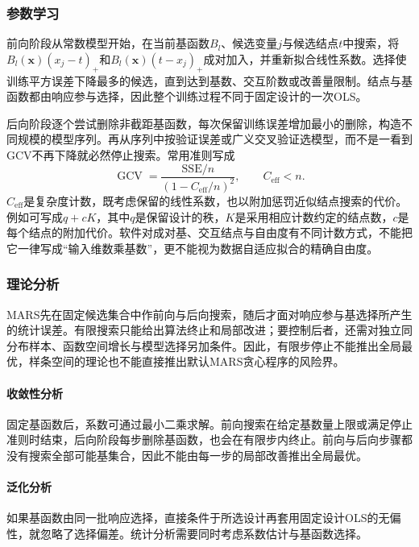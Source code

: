 \subsubsection{参数学习}

前向阶段从常数模型开始，在当前基函数$B_l$、候选变量$j$与候选结点$t$中搜索，将$B_l(\bm{x})(x_j-t)_+$和$B_l(\bm{x})(t-x_j)_+$成对加入，并重新拟合线性系数。选择使训练平方误差下降最多的候选，直到达到基数、交互阶数或改善量限制。结点与基函数都由响应参与选择，因此整个训练过程不同于固定设计的一次OLS。

后向阶段逐个尝试删除非截距基函数，每次保留训练误差增加最小的删除，构造不同规模的模型序列。再从序列中按验证误差或广义交叉验证选模型，而不是一看到GCV不再下降就必然停止搜索。常用准则写成
\begin{equation}
  \operatorname{GCV}
  =\frac{\mathrm{SSE}/n}{(1-C_{\mathrm{eff}}/n)^2},
  \qquad C_{\mathrm{eff}}<n.
  \label{eq:regression-mars-gcv}
\end{equation}
$C_{\mathrm{eff}}$是复杂度计数，既考虑保留的线性系数，也以附加惩罚近似结点搜索的代价。例如可写成$q+cK$，其中$q$是保留设计的秩，$K$是采用相应计数约定的结点数，$c$是每个结点的附加代价。软件对成对基、交互结点与自由度有不同计数方式，不能把它一律写成“输入维数乘基数”，更不能视为数据自适应拟合的精确自由度。

\subsubsection{理论分析}

MARS先在固定候选集合中作前向与后向搜索，随后才面对响应参与基选择所产生的统计误差。有限搜索只能给出算法终止和局部改进；要控制后者，还需对独立同分布样本、函数空间增长与模型选择另加条件。因此，有限步停止不能推出全局最优，样条空间的理论也不能直接推出默认MARS贪心程序的风险界。

\paragraph{收敛性分析}
固定基函数后，系数可通过最小二乘求解。前向搜索在给定基数量上限或满足停止准则时结束，后向阶段每步删除基函数，也会在有限步内终止。前向与后向步骤都没有搜索全部可能基集合，因此不能由每一步的局部改善推出全局最优。

\paragraph{泛化分析}
如果基函数由同一批响应选择，直接条件于所选设计再套用固定设计OLS的无偏性，就忽略了选择偏差。统计分析需要同时考虑系数估计与基函数选择。

